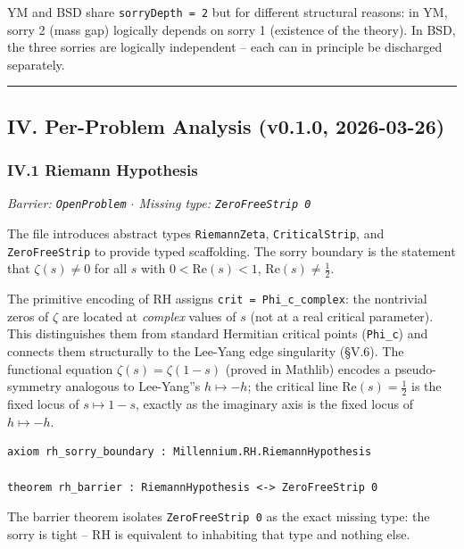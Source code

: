 \documentclass[12pt,a4paper]{article}
\newcommand{\pilcrow}{\S}
\begin{document}
YM and BSD share \texttt{sorryDepth = 2} but for different structural reasons: in YM, sorry 2 (mass gap) logically depends on sorry 1 (existence of the theory). In BSD, the three sorries are logically independent  --  each can in principle be discharged separately.

\begin{center}
\rule{0.5\textwidth}{0.4pt}
\end{center}

\subsection{IV. Per-Problem Analysis (v0.1.0, 2026-03-26)}

\subsubsection{IV.1 Riemann Hypothesis}

\emph{Barrier: \texttt{OpenProblem} $\cdot$ Missing type: \texttt{ZeroFreeStrip 0}}

The file introduces abstract types \texttt{RiemannZeta}, \texttt{CriticalStrip}, and \texttt{ZeroFreeStrip} to provide typed scaffolding. The sorry boundary is the statement that $\zeta(s) \neq 0$ for all $s$ with $0 < \text{Re}(s) < 1$, $\text{Re}(s) \neq \frac{1}{2}$.

The primitive encoding of RH assigns \texttt{crit = Phi\_c\_complex}: the nontrivial zeros of $\zeta$ are located at \emph{complex} values of $s$ (not at a real critical parameter). This distinguishes them from standard Hermitian critical points (\texttt{Phi\_c}) and connects them structurally to the Lee-Yang edge singularity (\pilcrow{}V.6). The functional equation $\zeta(s) = \zeta(1-s)$ (proved in Mathlib) encodes a pseudo-symmetry analogous to Lee-Yang''s $h \mapsto -h$; the critical line $\text{Re}(s) = \frac{1}{2}$ is the fixed locus of $s \mapsto 1-s$, exactly as the imaginary axis is the fixed locus of $h \mapsto -h$.

\begin{lstlisting}[language=lean]
axiom rh_sorry_boundary : Millennium.RH.RiemannHypothesis

theorem rh_barrier : RiemannHypothesis <-> ZeroFreeStrip 0
\end{lstlisting}

The barrier theorem isolates \texttt{ZeroFreeStrip 0} as the exact missing type: the sorry is tight  --  RH is equivalent to inhabiting that type and nothing else.
\end{document}
